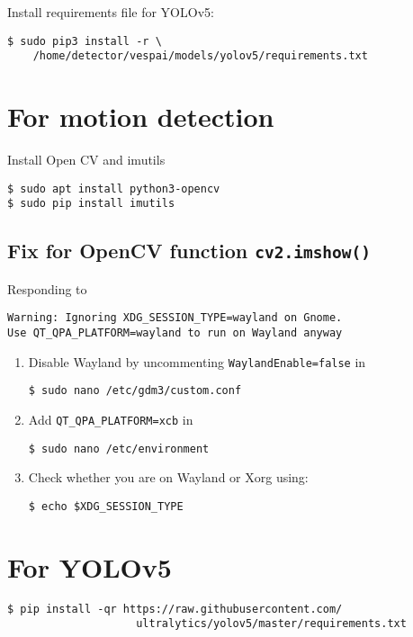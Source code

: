 \documentclass[12pt, a4paper, oneside]{article}
\begin{document}
Install requirements file for YOLOv5:
\begin{verbatim}
$ sudo pip3 install -r \
	/home/detector/vespai/models/yolov5/requirements.txt
\end{verbatim}


\section{For motion detection}
Install Open CV and imutils

\begin{verbatim}
$ sudo apt install python3-opencv
$ sudo pip install imutils
\end{verbatim}


\subsection{Fix for OpenCV function \texttt{cv2.imshow()}}

Responding to
\begin{verbatim}
Warning: Ignoring XDG_SESSION_TYPE=wayland on Gnome.
Use QT_QPA_PLATFORM=wayland to run on Wayland anyway
\end{verbatim}

\begin{enumerate}

\item
Disable Wayland by uncommenting \texttt{WaylandEnable=false} in
\begin{verbatim}
$ sudo nano /etc/gdm3/custom.conf
\end{verbatim}

\item
Add \texttt{QT\_QPA\_PLATFORM=xcb} in
\begin{verbatim}
$ sudo nano /etc/environment
\end{verbatim}

\item
Check whether you are on Wayland or Xorg using:
\begin{verbatim}
$ echo $XDG_SESSION_TYPE
\end{verbatim}
\end{enumerate}


\section{For YOLOv5}

\begin{verbatim}
$ pip install -qr https://raw.githubusercontent.com/
					ultralytics/yolov5/master/requirements.txt
\end{verbatim}
\end{document}
